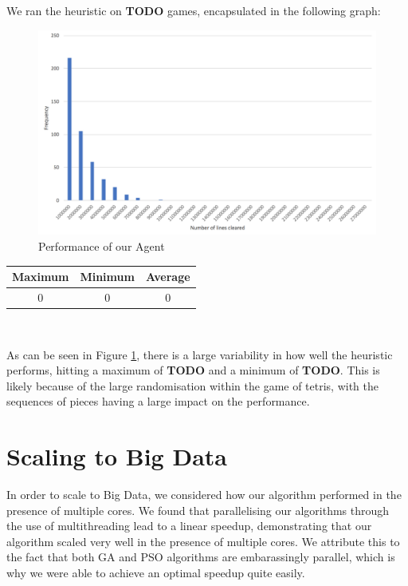\documentclass[12pt]{article}
\begin{document}
	We ran the heuristic on \textbf{TODO} games, encapsulated in the following graph:\\

		\begin{figure}[h]
			\includegraphics[scale=0.3]{heuristic/heuristic}
			\centering
			\caption{Performance of our Agent}
			\label{fig:agent}
		\end{figure}

		\begin{center}
			\begin{tabular}{ | c | c | c | }
				\hline
				Maximum & Minimum & Average \\ \hline
				0 & 0 & 0 \\ \hline
			\end{tabular}\\
		\end{center}




	As can be seen in Figure \ref{fig:agent}, there is a large variability in how
	well the heuristic performs, hitting a maximum of \textbf{TODO} and a minimum of \textbf{TODO}.
	This is likely because of the large randomisation within the game of tetris,
	with the sequences of pieces having a large impact on the performance.

	\vspace{-0.3cm}
    \section{Scaling to Big Data}
	\vspace{-0.3cm}
	In order to scale to Big Data, we considered how our algorithm performed in the presence
	of multiple cores. We found that parallelising our algorithms through the use
	of multithreading lead to a linear speedup, demonstrating that our algorithm scaled very
	well in the presence of multiple cores. We attribute this to the fact that
	both GA and PSO algorithms are embarassingly parallel, which
	is why we were able to achieve an optimal speedup quite easily.\\
\end{document}

